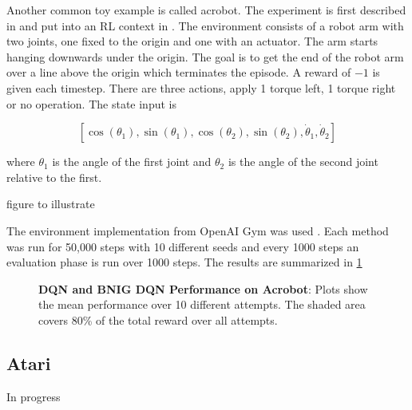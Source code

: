 Another common toy example is called acrobot. The experiment is first described in \cite{hauser_1990} and put into an RL context in \cite{sutton_1996}. The environment consists of a robot arm with two joints, one fixed to the origin and one with an actuator. The arm starts hanging downwards under the origin. The goal is to get the end of the robot arm over a line above the origin which terminates the episode. A reward of $-1$ is given each timestep. There are three actions, apply 1 torque left, 1 torque right or no operation. The state input is

$$
[\cos(\theta_1), \sin(\theta_1), \cos(\theta_2), \sin(\theta_2), \dot{\theta}_1, \dot{\theta}_2]
$$

where $\theta_1$ is the angle of the first joint and $\theta_2$ is the angle of the second joint relative to the first.

\todo figure to illustrate 

The environment implementation from OpenAI Gym was used \citep{OpenAI_gym}. Each method was run for 50,000 steps with 10 different seeds and every 1000 steps an evaluation phase is run over 1000 steps. The results are summarized in \ref{fig:nn_acrobot}


\begin{figure}[H]
    \centering
    \caption{\textbf{DQN and BNIG DQN Performance on Acrobot}: Plots show the mean performance over 10 different attempts. The shaded area covers 80\% of the total reward over all attempts.}
    \label{fig:nn_acrobot}
\end{figure}

\subsection{Atari}

In progress

\cleardoublepage